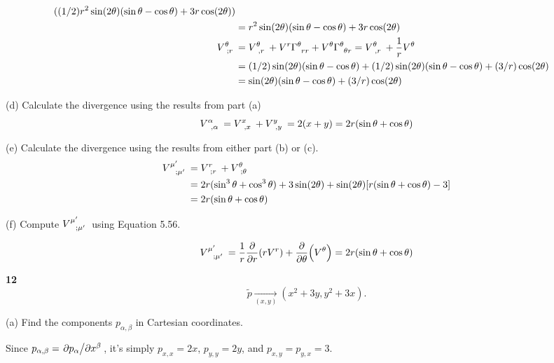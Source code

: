 \documentclass[gr-notes.tex]{subfiles}
\begin{document}
\begin{align*}
  ((1/2) r^2 \sin(2\theta) (\sin\theta - \cos\theta) + 3 r \cos(2\theta))
  \\ &=
  r^2 \sin(2\theta) (\sin\theta - \cos\theta) + 3 r \cos(2\theta)
  \\
  \tensor{V}{^\theta_{;r}} &=
  \tensor{V}{^\theta_{,r}} +
  V^r \tensor{\Gamma}{^\theta_{rr}} +
  V^\theta \tensor{\Gamma}{^\theta_{\theta r}} =
  \tensor{V}{^\theta_{,r}} +
  \frac{1}{r}
  V^\theta
  \\ &=
  (1/2) \sin(2\theta) (\sin\theta - \cos\theta) +
  (1/2) \sin(2\theta) (\sin\theta - \cos\theta) +
  (3/r) \cos(2\theta)
  \\ &=
  \sin(2\theta) (\sin\theta - \cos\theta) +
  (3/r) \cos(2\theta)
\end{align*}


(d)
Calculate the divergence using the results from part (a)
%
\begin{displaymath}
  \tensor{V}{^\alpha_{,\alpha}} =
  \tensor{V}{^x_{,x}} + \tensor{V}{^y_{,y}} =
  2 (x + y) =
  2 r (\sin\theta + \cos\theta)
\end{displaymath}


(e)
Calculate the divergence using the results from either part (b) or (c).
%
\begin{align*}
  \tensor{V}{^{\mu'}_{;\mu'}} &=
  \tensor{V}{^{r}_{;r}} +
  \tensor{V}{^{\theta}_{;\theta}}
  \\ &=
  2 r (\sin^3\theta + \cos^3\theta) +
  3 \sin(2\theta) +
  \sin(2\theta) [r (\sin\theta + \cos\theta) - 3]
  \\ &=
  2 r (\sin\theta + \cos\theta)
\end{align*}



(f)
Compute $\tensor{V}{^{\mu'}_{;\mu'}}$ using Equation 5.56.

\begin{displaymath}
  \tensor{V}{^{\mu'}_{;\mu'}} =
  \frac{1}{r} \pdv{r} (r V^r) + \pdv{\theta} (V^\theta) =
  2 r (\sin\theta + \cos\theta)
\end{displaymath}




\textbf{12}
%
\begin{displaymath}
  \tilde{p} \underset{(x,y)}{\to} (x^2 + 3y, y^2 + 3x).
\end{displaymath}

(a)
Find the components $p_{\alpha,\beta}$ in Cartesian coordinates.

Since $p_{\alpha,\beta} = \pdv*{p_\alpha}{x^\beta}$, it's simply $p_{x,x} = 2x$, $p_{y,y} = 2y$, and $p_{x,y} = p_{y,x} = 3$.
\end{document}

